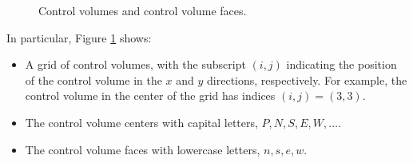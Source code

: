 \begin{figure}[H]
    \centering
    \def\nCV{5}
    \def\dX{1.5cm}
    \def\dY{1.5cm}
    \def\labelsH{{"WW", "W", "P", "E", "EE"}}
    \def\labelsV{{"SS", "S", "P", "N", "NN"}}

    \caption{Control volumes and control volume faces.}
    \label{fig:control_volume}
\end{figure}

In particular, Figure \ref{fig:control_volume} shows:

\begin{itemize}
    \item A grid of control volumes, with the subscript $(i,j)$ indicating the position of the control volume in the $x$ and $y$ directions, respectively. For example, the control volume in the center of the grid has indices $(i,j)=(3,3)$.
    \item The control volume centers with capital letters, $P, N, S, E, W, \ldots$.
    \item The control volume faces with lowercase letters, $n, s, e, w$.
\end{itemize}

